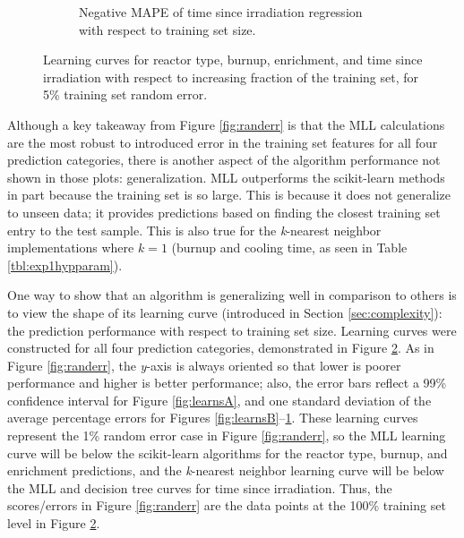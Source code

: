 \begin{figure}[!htb]
\begin{subfigure}[b]{0.49\textwidth}
    \caption{Negative \gls{MAPE} of time since irradiation regression with 
             respect to training set size.}
    \label{fig:learnsD}
  \end{subfigure}
  \caption{Learning curves for reactor type, burnup, enrichment, and time 
           since irradiation with respect to increasing fraction of the 
           training set, for 5\% training set random error.}
  \label{fig:learns}
\end{figure}

Although a key takeaway from Figure \ref{fig:randerr} is that the \gls{MLL}
calculations are the most robust to introduced error in the training set
features for all four prediction categories, there is another aspect of the
algorithm performance not shown in those plots: generalization. \Gls{MLL}
outperforms the scikit-learn methods in part because the training set is so
large. This is because it does not generalize to unseen data; it provides
predictions based on finding the closest training set entry to the test sample.
This is also true for the \textit{k}-nearest neighbor implementations where
$k=1$ (burnup and cooling time, as seen in Table \ref{tbl:exp1hypparam}).

One way to show that an algorithm is generalizing well in comparison to others
is to view the shape of its learning curve (introduced in Section
\ref{sec:complexity}): the prediction performance with respect to training set
size.  Learning curves were constructed for all four prediction categories,
demonstrated in Figure \ref{fig:learns}. As in Figure \ref{fig:randerr}, the
\textit{y}-axis is always oriented so that lower is poorer performance and
higher is better performance; also, the error bars reflect a 99\% confidence
interval for Figure \ref{fig:learnsA}, and one standard deviation of the
average percentage errors for Figures \ref{fig:learnsB}--\ref{fig:learnsD}.
These learning curves represent the 1\% random error case in Figure
\ref{fig:randerr}, so the \gls{MLL} learning curve will be below the
scikit-learn algorithms for the reactor type, burnup, and enrichment
predictions, and the \textit{k}-nearest neighbor learning curve will be below
the \gls{MLL} and decision tree curves for time since irradiation.  Thus, the
scores/errors in Figure \ref{fig:randerr} are the data points at the 100\%
training set level in Figure \ref{fig:learns}.  

